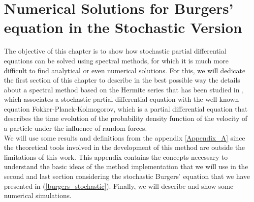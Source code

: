 \chapter{Numerical Solutions for Burgers' equation in the Stochastic Version}
\label{Chapter_4}
	
	The objective of this chapter is to show how stochastic partial differential equations can be solved using spectral methods, for which it is much more difficult to find analytical or even numerical solutions. For this, we will dedicate the first section of this chapter to describe in the best possible way the details about a spectral method based on the Hermite series that has been studied in \cite{Delgado2016}, which associates a stochastic partial differential equation with the well-known equation Fokker-Planck-Kolmogorov, which is a partial differential equation that describes the time evolution of the probability density function of the velocity of a particle under the influence of random forces. \\

	We will use some results and definitions from the appendix \ref{Appendix_A} since the theoretical tools involved in the development of this method are outside the limitations of this work. This appendix contains the concepts necessary to understand the basic ideas of the method implementation that we will use in the second and last section considering the stochastic Burgers' equation that we have presented in (\ref{burgers_stochastic}). Finally, we will describe and show some numerical simulations. 

		
	\newpage
	
	